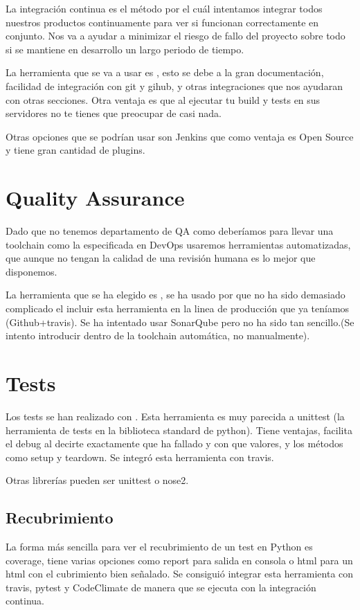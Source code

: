 La integración continua es el método por el cuál intentamos integrar todos nuestros productos continuamente para ver si funcionan correctamente en conjunto. Nos va a ayudar a minimizar el riesgo de fallo del proyecto sobre todo si se mantiene en desarrollo un largo periodo de tiempo.

La herramienta que se va a usar es , esto se debe a la gran documentación, facilidad de integración con git y gihub, y otras integraciones que nos ayudaran con otras secciones. Otra ventaja es que al ejecutar tu build y tests en sus servidores no te tienes que preocupar de casi nada.

Otras opciones que se podrían usar son Jenkins que como ventaja es Open Source y tiene gran cantidad de plugins.


\section{Quality Assurance}

Dado que no tenemos departamento de QA como deberíamos para llevar una toolchain como la especificada en DevOps usaremos herramientas automatizadas, que aunque no tengan la calidad de una revisión humana es lo mejor que disponemos. 

La herramienta que se ha elegido es , se ha usado por que no ha sido demasiado complicado el incluir esta herramienta en la linea de producción que ya teníamos (Github+travis). Se ha intentado usar SonarQube pero no ha sido tan sencillo.(Se intento introducir dentro de la toolchain automática, no manualmente). 


\section{Tests}

Los tests se han realizado con . Esta herramienta es muy parecida a unittest (la herramienta de tests en la biblioteca standard de python). Tiene ventajas, facilita el debug al decirte exactamente que ha fallado y con que valores, y los métodos como setup y teardown. Se integró esta herramienta con travis.

Otras librerías pueden ser unittest o nose2.


\subsection{Recubrimiento}

La forma más sencilla para ver el recubrimiento de un test en Python es coverage, tiene varias opciones como report para salida en consola o html para un html con el cubrimiento bien señalado. Se consiguió integrar esta herramienta con travis, pytest y CodeClimate de manera que se ejecuta con la integración continua.


